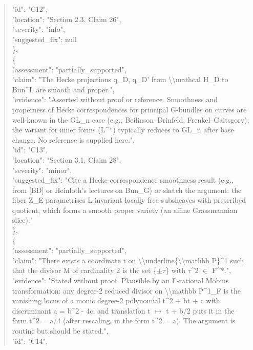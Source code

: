 \documentclass[11pt]{article}
\begin{document}
\begin{quote}
      "id": "C12",\\
      "location": "Section 2.3, Claim 26",\\
      "severity": "info",\\
      "suggested\_fix": null\\
    \},\\
    \{\\
      "assessment": "partially\_supported",\\
      "claim": "The Hecke projections q\_D, q\_D' from \textbackslash{}\textbackslash{}mathcal H\_D to Bun\^{}L are smooth and proper.",\\
      "evidence": "Asserted without proof or reference. Smoothness and properness of Hecke correspondences for principal G-bundles on curves are well-known in the GL\_n case (e.g., Beilinson--Drinfeld, Frenkel--Gaitsgory); the variant for inner forms (L\^{}*) typically reduces to GL\_n after base change. No reference is supplied here.",\\
      "id": "C13",\\
      "location": "Section 3.1, Claim 28",\\
      "severity": "minor",\\
      "suggested\_fix": "Cite a Hecke-correspondence smoothness result (e.g., from [BD] or Heinloth's lectures on Bun\_G) or sketch the argument: the fiber Z\_E parametrises L-invariant locally free subsheaves with prescribed quotient, which forms a smooth proper variety (an affine Grassmannian slice)."\\
    \},\\
    \{\\
      "assessment": "partially\_supported",\\
      "claim": "There exists a coordinate t on \textbackslash{}\textbackslash{}underline\{\textbackslash{}\textbackslash{}mathbb P\}\^{}1 such that the divisor M of cardinality 2 is the set \{\ensuremath{\pm}\ensuremath{\tau}\} with \ensuremath{\tau}\^{}2 \ensuremath{\in} F\^{}*.",\\
      "evidence": "Stated without proof. Plausible by an F-rational Möbius transformation: any degree-2 reduced divisor on \textbackslash{}\textbackslash{}mathbb P\^{}1\_F is the vanishing locus of a monic degree-2 polynomial t\^{}2 + bt + c with discriminant a = b\^{}2 - 4c, and translation t \ensuremath{\mapsto} t + b/2 puts it in the form t\^{}2 = a/4 (after rescaling, in the form t\^{}2 = a). The argument is routine but should be stated.",\\
      "id": "C14",\\

\end{quote}
\end{document}
